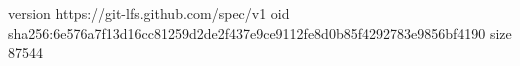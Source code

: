 version https://git-lfs.github.com/spec/v1
oid sha256:6e576a7f13d16cc81259d2de2f437e9ce9112fe8d0b85f4292783e9856bf4190
size 87544
